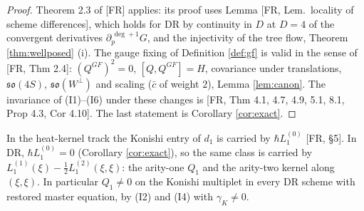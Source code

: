 \begin{proof}
Theorem 2.3 of [FR] applies: its proof uses Lemma [FR, Lem.\ locality of scheme differences], which holds for DR by continuity in $D$ at $D=4$ of the convergent derivatives $\partial_p^{\,\deg+1}G$, and the injectivity of the tree flow, Theorem \ref{thm:wellposed} (i). The gauge fixing of Definition \ref{def:gf} is valid in the sense of [FR, Thm 2.4]: $(Q^{GF})^2=0$, $[Q,Q^{GF}]=H$, covariance under translations, $\mathfrak{so}(4S)$, $\mathfrak{so}(W^\perp)$ and scaling ($\bar c$ of weight $2$), Lemma \ref{lem:canon}. The invariance of (I1)--(I6) under these changes is [FR, Thm 4.1, 4.7, 4.9, 5.1, 8.1, Prop 4.3, Cor 4.10]. The last statement is Corollary \ref{cor:exact}.
\end{proof}

\begin{remark}
\label{rem:twistDR}
In the heat-kernel track the Konishi entry of $d_1$ is carried by $\hbar L_1^{(0)}$ [FR, §5]. In DR, $\hbar L_1^{(0)}=0$ (Corollary \ref{cor:exact}), so the same class is carried by $L_1^{(1)}(\xi)-\frac12L_1^{(2)}(\xi,\xi)$: the arity-one $Q_1$ and the arity-two kernel along $(\xi,\xi)$. In particular $Q_1\neq0$ on the Konishi multiplet in every DR scheme with restored master equation, by (I2) and (I4) with $\gamma_K\neq0$.
\end{remark}
